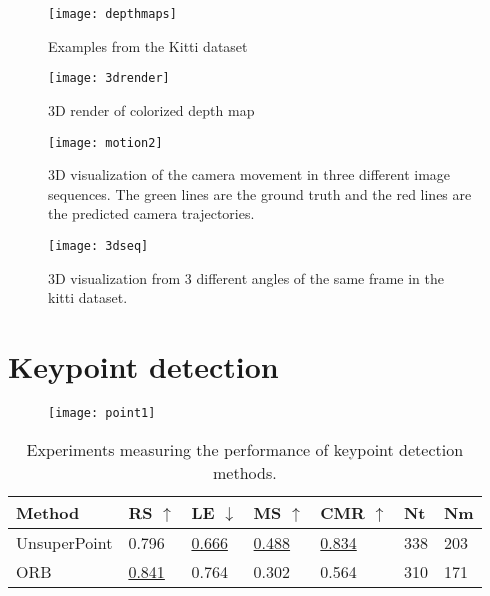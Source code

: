 \iffalse
\begin{figure}[H]
	\centering
	\texttt{[image: evaluation]}
	\caption{Evaluation metrics when testing the configurations on the testing split of the datasets}
	\label{fig:evaluation}
\end{figure}
\fi

\clearpage

\begin{figure}[H]
	\centering
	\texttt{[image: depthmaps]}
	\caption{Examples from the Kitti dataset}
	\label{fig:depthmapskitty}
\end{figure}


\begin{figure}[H]
	\centering
	\texttt{[image: 3drender]}
	\caption{3D render of colorized depth map}
	\label{fig:3drender}
\end{figure}

\begin{figure}[H]
	\centering
	\texttt{[image: motion2]}
	\caption{3D visualization of the camera movement in three different image sequences. The green lines are the ground truth and the red lines are the predicted camera trajectories.}
	\label{fig:movement}
\end{figure}

\begin{figure}[H]
	\centering
	\texttt{[image: 3dseq]}
	\caption{3D visualization from 3 different angles of the same frame in the kitti dataset.}
	\label{fig:3dseq}
\end{figure}

\section{Keypoint detection}

\begin{figure}[H]
	\centering
	\texttt{[image: point1]}
	\caption{}
	\label{fig:point1}
\end{figure}

\begin{table}[H]
\centering
\begin{tabular}{|l|l|l|l|l|l|l|}
\hline
Method & RS $\uparrow$ & LE $\downarrow$ & MS $\uparrow$ & CMR $\uparrow$ & Nt & Nm \\
\hline
UnsuperPoint & 0.796 & \underline{0.666} & \underline{0.488} & \underline{0.834} & 338 & 203 \\
ORB & \underline{0.841} & 0.764 & 0.302 & 0.564 & 310 & 171 \\
\hline
\end{tabular}
\caption{Experiments measuring the performance of keypoint detection methods.}
\label{table:pointsbenchmark}
\end{table}

